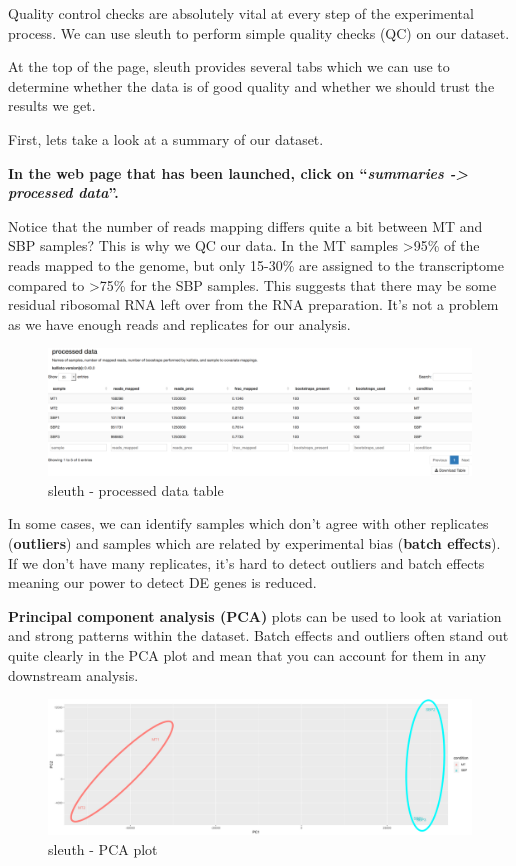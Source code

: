 \documentclass[11pt]{article}
\begin{document}
Quality control checks are absolutely vital at every step of the
experimental process. We can use sleuth to perform simple quality checks
(QC) on our dataset.

At the top of the page, sleuth provides several tabs which we can use to
determine whether the data is of good quality and whether we should
trust the results we get.

First, lets take a look at a summary of our dataset.

\textbf{In the web page that has been launched, click on
``\textit{summaries -\textgreater{} processed data}''.}

Notice that the number of reads mapping differs quite a bit between MT
and SBP samples? This is why we QC our data. In the MT samples
\textgreater95\% of the reads mapped to the genome, but only 15-30\% are
assigned to the transcriptome compared to \textgreater75\% for the SBP
samples. This suggests that there may be some residual ribosomal RNA
left over from the RNA preparation. It's not a problem as we have enough
reads and replicates for our analysis.

    \begin{figure}[!h]
\centering
\includegraphics{images/sleuth-processed-data.png}
\caption{sleuth - processed data table}
\end{figure}

    In some cases, we can identify samples which don't agree with other
replicates (\textbf{outliers}) and samples which are related by
experimental bias (\textbf{batch effects}). If we don't have many
replicates, it's hard to detect outliers and batch effects meaning our
power to detect DE genes is reduced.

\textbf{Principal component analysis (PCA)} plots can be used to look at
variation and strong patterns within the dataset. Batch effects and
outliers often stand out quite clearly in the PCA plot and mean that you
can account for them in any downstream analysis.

    \begin{figure}[!h]
\centering
\includegraphics{images/sleuth-pca.png}
\caption{sleuth - PCA plot}
\end{figure}
\end{document}
